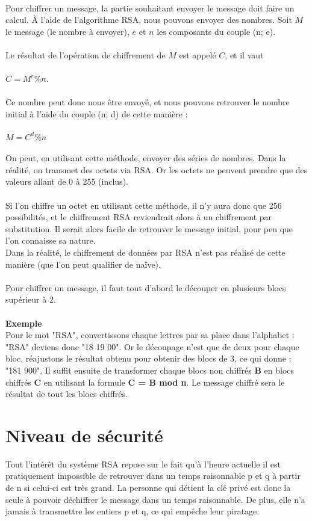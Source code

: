 		\\
		Pour chiffrer un message, la partie souhaitant envoyer le message doit faire un calcul. À l'aide de l'algorithme RSA, nous pouvons envoyer des nombres. Soit $M$ le message (le nombre à envoyer), $e$ et $n$ les composants du couple (n; e).\\
		\\
		Le résultat de l'opération de chiffrement de $M$ est appelé $C$, et il vaut\\
		\\
		$C = M^e \% n$.\\
		\\
		Ce nombre peut donc nous être envoyé, et nous pouvons retrouver le nombre initial à l'aide du couple (n; d) de cette manière :\\
		\\
		$M = C^d \% n$\\
		\\
		On peut, en utilisant cette méthode, envoyer des séries de nombres. Dans la réalité, on transmet des octets via RSA. Or les octets ne peuvent prendre que des valeurs allant de 0 à 255 (inclus).\\
		\\
		Si l'on chiffre un octet en utilisant cette méthode, il n'y aura donc que 256 possibilités, et le chiffrement RSA reviendrait alors à un chiffrement par substitution. Il serait alors facile de retrouver le message initial, pour peu que l'on connaisse sa nature.\\
		Dans la réalité, le chiffrement de données par RSA n'est pas réalisé de cette manière (que l'on peut qualifier de naïve).\\
		\\
		Pour chiffrer un message, il faut tout d'abord le découper en plusieurs blocs supérieur à 2.
		\\\\\textbf{Exemple}\\
		Pour le mot "RSA", convertissons chaque lettres par sa place dans l’alphabet : "RSA" deviens donc "18 19 00". Or le découpage n'est que de deux pour chaque bloc, réajustons le résultat obtenu pour obtenir des blocs de 3, ce qui donne : "181 900". Il suffit ensuite de transformer chaque blocs non chiffrés \textbf{B} en blocs chiffrés \textbf{C} en utilisant la formule \textbf{C = B mod n}. Le message chiffré sera le résultat de tout les blocs chiffrés. 
	\section{Niveau de sécurité}
		Tout l'intérêt du système RSA repose sur le fait qu'à l'heure actuelle il est pratiquement impossible de retrouver dans un temps raisonnable p et q à partir de n si celui-ci est très grand. La personne qui détient la clé privé est donc la seule à pouvoir déchiffrer le message dans un temps raisonnable. De plus, elle n'a jamais à transmettre les entiers p et q, ce qui empêche leur piratage.
		
